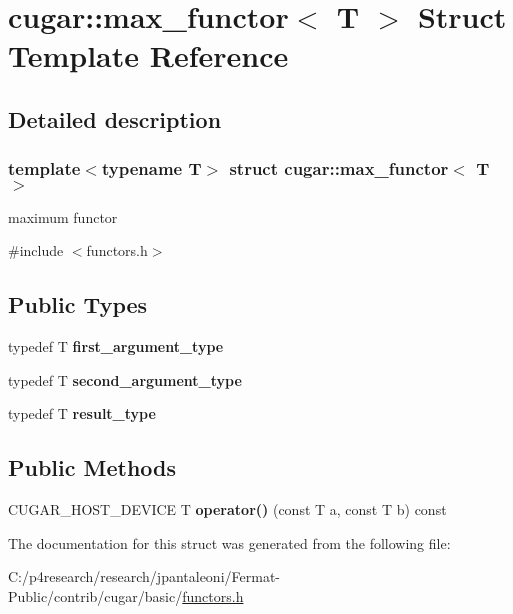 \hypertarget{structcugar_1_1max__functor}{}\section{cugar\+:\+:max\+\_\+functor$<$ T $>$ Struct Template Reference}
\label{structcugar_1_1max__functor}


\subsection{Detailed description}
\subsubsection*{template$<$typename T$>$\newline
struct cugar\+::max\+\_\+functor$<$ T $>$}

maximum functor 

{\ttfamily \#include $<$functors.\+h$>$}

\subsection*{Public Types}
\begin{DoxyCompactItemize}
\item 
\mbox{\label{structcugar_1_1max__functor_adf74be27f6f41ca1ecc3c65d33d5d388}} 
typedef T {\bfseries first\+\_\+argument\+\_\+type}
\item 
\mbox{\label{structcugar_1_1max__functor_ab4ea5b04ee168b01fb44b1452a85c565}} 
typedef T {\bfseries second\+\_\+argument\+\_\+type}
\item 
\mbox{\label{structcugar_1_1max__functor_a2202b44be5860713bc909005173c5a2c}} 
typedef T {\bfseries result\+\_\+type}
\end{DoxyCompactItemize}
\subsection*{Public Methods}
\begin{DoxyCompactItemize}
\item 
\mbox{\label{structcugar_1_1max__functor_a71e35a09181eb1256e7652125373c243}} 
C\+U\+G\+A\+R\+\_\+\+H\+O\+S\+T\+\_\+\+D\+E\+V\+I\+CE T {\bfseries operator()} (const T a, const T b) const
\end{DoxyCompactItemize}


The documentation for this struct was generated from the following file\+:\begin{DoxyCompactItemize}
\item 
C\+:/p4research/research/jpantaleoni/\+Fermat-\/\+Public/contrib/cugar/basic/\hyperlink{functors_8h}{functors.\+h}\end{DoxyCompactItemize}
